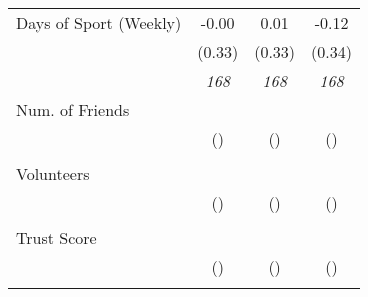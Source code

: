 \begin{tabular}{l c c c}
Days of Sport (Weekly) & -0.00 & 0.01 & -0.12 \\
& (0.33) & (0.33) & (0.34) \\
& \textit{ 168 } & \textit{ 168 } & \textit{ 168 } \\
Num. of Friends & & & \\
& () & () & () \\
& & & \\
Volunteers & & & \\
& () & () & () \\
& & & \\
Trust Score & & & \\
& () & () & () \\
& & & \\
\bottomrule
\end{tabular}
